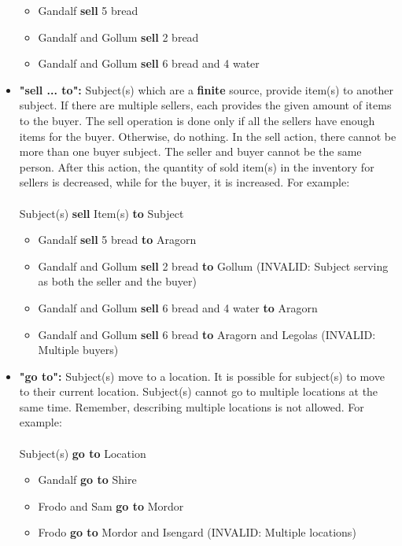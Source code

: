 \documentclass[12pt]{article}
\begin{document}
\begin{itemize}
\begin{itemize}
        \item Gandalf \textbf{sell} 5 bread
        \item Gandalf and Gollum \textbf{sell} 2 bread
        \item Gandalf and Gollum \textbf{sell} 6 bread and 4 water

\end{itemize}

\item \textbf{"sell ... to":} Subject(s) which are a \textbf{finite} source, provide item(s) to another subject. If there are multiple sellers, each provides the given amount of items to the buyer. The sell operation is done only if all the sellers have enough items for the buyer. Otherwise, do nothing. In the sell action, there cannot be more than one buyer subject. The seller and buyer cannot be the same person. After this action, the quantity of sold item(s) in the inventory for sellers is decreased, while for the buyer, it is increased. For example: \\\\
Subject(s) \textbf{sell} Item(s) \textbf{to} Subject
        \begin{itemize}

        \item Gandalf \textbf{sell} 5 bread \textbf{to} Aragorn
\item Gandalf and Gollum \textbf{sell} 2 bread \textbf{to} Gollum (INVALID: Subject serving as both the seller and the buyer)
\item Gandalf and Gollum \textbf{sell} 6 bread and 4 water \textbf{to} Aragorn
\item Gandalf and Gollum \textbf{sell} 6 bread \textbf{to} Aragorn and Legolas (INVALID: Multiple buyers)

        \end{itemize}
\item \textbf{"go to":} Subject(s) move to a location. It is possible for subject(s) to move to their current location. Subject(s) cannot go to multiple locations at the same time. Remember, describing multiple locations is not allowed. For example:\\\\
Subject(s) \textbf{go to} Location
        \begin{itemize}
        \item Gandalf \textbf{go to} Shire
        \item Frodo and Sam \textbf{go to} Mordor
        \item Frodo \textbf{go to} Mordor and Isengard (INVALID: Multiple locations) 
        \end{itemize}
\end{itemize}
\end{document}
